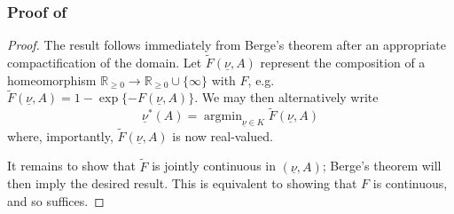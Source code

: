 \documentclass{article} %
\newcommand{\R}{\mathbb{R}}
\newcommand{\ul}[1]{\underline{#1}}
\DeclareMathOperator{\argmin}{argmin}
\begin{document}
\subsubsection{Proof of  }
\begin{proof}
    The result follows immediately from Berge's theorem after an appropriate compactification of the domain. Let $\tilde{F}(\ul{\nu},A)$ represent the composition of a homeomorphism $\R_{\geq0}\longrightarrow \R_{\geq0}\cup\{\infty\}$ with $F$, e.g. $\tilde{F}(\ul{\nu},A)=1-\exp\{- F(\ul{\nu},A)\}$. We may then alternatively write
\[
\ul{\nu}^*(A)=\argmin_{\ul{\nu}\in K} \tilde{F}(\ul{\nu},A)
\]
where, importantly, $\tilde{F}(\ul{\nu},A)$ is now real-valued.

It remains to show that $\tilde{F}$ is jointly continuous in $(\ul{\nu},A)$; Berge's theorem will then imply the desired result. This is equivalent to showing that $F$ is continuous, and so  suffices.
\end{proof}
\end{document}
